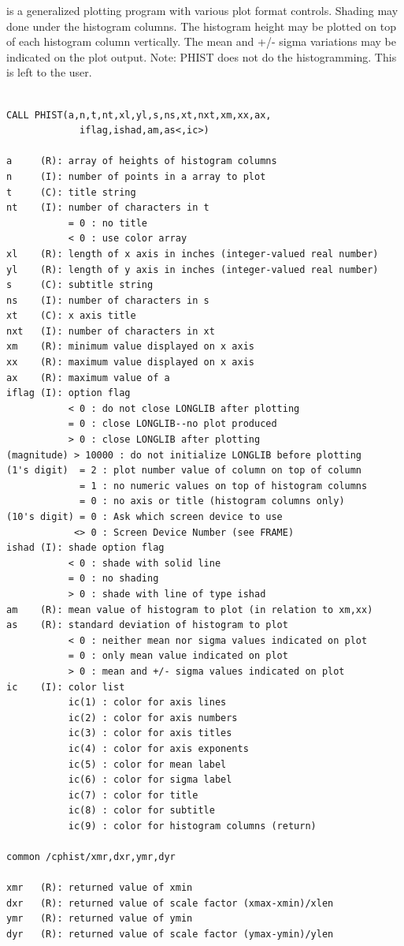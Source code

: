 \documentclass[11pt]{report}
\begin{document}
 is a generalized  plotting program with various
plot format controls.  Shading may done under the histogram columns.
The histogram height may be plotted on top of each histogram column
vertically.  The mean and +/- sigma variations may be indicated on the
plot output.  Note: PHIST does not do the histogramming.  This is left
to the user.
\begin{verbatim}

CALL PHIST(a,n,t,nt,xl,yl,s,ns,xt,nxt,xm,xx,ax,
             iflag,ishad,am,as<,ic>)

a     (R): array of heights of histogram columns
n     (I): number of points in a array to plot
t     (C): title string
nt    (I): number of characters in t
           = 0 : no title
           < 0 : use color array
xl    (R): length of x axis in inches (integer-valued real number)
yl    (R): length of y axis in inches (integer-valued real number)
s     (C): subtitle string
ns    (I): number of characters in s
xt    (C): x axis title
nxt   (I): number of characters in xt
xm    (R): minimum value displayed on x axis
xx    (R): maximum value displayed on x axis
ax    (R): maximum value of a
iflag (I): option flag
           < 0 : do not close LONGLIB after plotting
           = 0 : close LONGLIB--no plot produced
           > 0 : close LONGLIB after plotting
(magnitude) > 10000 : do not initialize LONGLIB before plotting
(1's digit)  = 2 : plot number value of column on top of column
             = 1 : no numeric values on top of histogram columns
             = 0 : no axis or title (histogram columns only)
(10's digit) = 0 : Ask which screen device to use
            <> 0 : Screen Device Number (see FRAME)
ishad (I): shade option flag
           < 0 : shade with solid line
           = 0 : no shading
           > 0 : shade with line of type ishad
am    (R): mean value of histogram to plot (in relation to xm,xx)
as    (R): standard deviation of histogram to plot
           < 0 : neither mean nor sigma values indicated on plot
           = 0 : only mean value indicated on plot
           > 0 : mean and +/- sigma values indicated on plot
ic    (I): color list
           ic(1) : color for axis lines
           ic(2) : color for axis numbers
           ic(3) : color for axis titles
           ic(4) : color for axis exponents
           ic(5) : color for mean label
           ic(6) : color for sigma label
           ic(7) : color for title
           ic(8) : color for subtitle
           ic(9) : color for histogram columns (return)

common /cphist/xmr,dxr,ymr,dyr

xmr   (R): returned value of xmin
dxr   (R): returned value of scale factor (xmax-xmin)/xlen
ymr   (R): returned value of ymin
dyr   (R): returned value of scale factor (ymax-ymin)/ylen
\end{verbatim}
\end{document}
